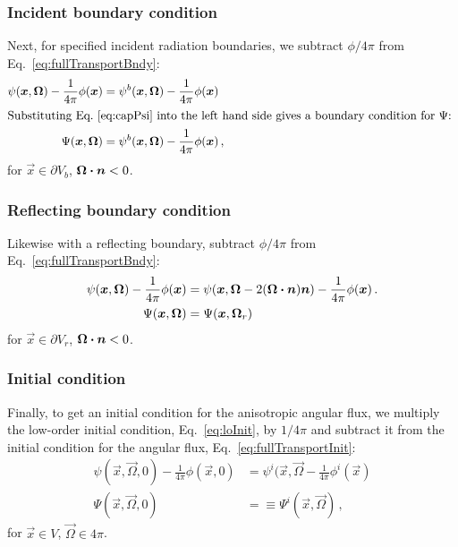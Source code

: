 \subsubsection{Incident boundary condition}
Next, for specified incident radiation boundaries, we subtract $\phi/4\pi$ from 
Eq.~\eqref{eq:fullTransportBndy}:
\begin{align}\nonumber
  \psi(\vec{x}, \vec{\Omega}) - \frac{1}{4\pi} \phi(\vec{x})
  &= \psi^b(\vec{x}, \vec{\Omega}) - \frac{1}{4\pi} \phi(\vec{x})
  \\ 
  \intertext{Substituting Eq.~\eqref{eq:capPsi} into the left hand side gives a
  boundary condition for $\Psi$:
  } \label{eq:capPsiBndy}
 \Psi(\vec{x}, \vec{\Omega}) 
  &=\psi^b(\vec{x}, \vec{\Omega}) - \frac{1}{4\pi} \phi(\vec{x})\,,
\end{align}
for $\vec{x} \in \partial V_b$, $\vec{\Omega} \vd \vec{n} < 0$.

\subsubsection{Reflecting boundary condition}
Likewise with a reflecting boundary, subtract $\phi/4\pi$ from 
Eq.~\eqref{eq:fullTransportBndy}:
\begin{align}\nonumber
  \psi(\vec{x}, \vec{\Omega}) - \frac{1}{4\pi} \phi(\vec{x})
  &= \psi(\vec{x}, \vec{\Omega} - 2(\vec{\Omega} \vd \vec{n}) \vec{n})
   - \frac{1}{4\pi} \phi(\vec{x})\,.
  \\ \label{eq:capPsiRefl}
 \Psi(\vec{x}, \vec{\Omega}) 
  &= \Psi(\vec{x}, \vec{\Omega}_r)
\end{align}
for $\vec{x} \in \partial V_r$, $\vec{\Omega} \vd \vec{n} < 0$.

\subsubsection{Initial condition}
Finally, to get an initial condition for the anisotropic angular flux, we
multiply the low-order initial condition, Eq.~\eqref{eq:loInit}, by $1/4\pi$ and
subtract it from the initial condition for the angular flux,
Eq.~\eqref{eq:fullTransportInit}:
\begin{align}\nonumber
  \psi(\vec{x}, \vec{\Omega}, 0) - \frac{1}{4\pi}\phi(\vec{x}, 0)
 &= \psi^i(\vec{x}, \vec{\Omega} - \frac1{4\pi} \phi^i(\vec{x})
 \\ \label{eq:capPsiInit}
 \Psi(\vec{x}, \vec{\Omega}, 0)
 &=\equiv \Psi^i(\vec{x}, \vec{\Omega})
 \,,
\end{align}
for $\vec{x} \in V$, $\vec{\Omega} \in 4\pi$.

